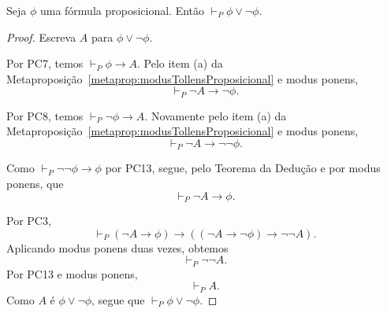 \begin{metalemma}\label{mlem:terceiroExcluidoProposicional}
    Seja $\phi$ uma fórmula proposicional.
    Então $\vdash_P \phi\vee \neg \phi$.
\end{metalemma}
\begin{proof}
    Escreva $A$ para $\phi\vee\neg\phi$.

    Por PC7, temos $\vdash_P \phi\rightarrow A$.
    Pelo item (a) da Metaproposição~\ref{metaprop:modusTollensProposicional} e modus ponens,
    \[
        \vdash_P \neg A\rightarrow \neg\phi.
    \]

    Por PC8, temos $\vdash_P \neg\phi\rightarrow A$.
    Novamente pelo item (a) da Metaproposição~\ref{metaprop:modusTollensProposicional} e modus ponens,
    \[
        \vdash_P \neg A\rightarrow \neg\neg\phi.
    \]

    Como $\vdash_P \neg\neg\phi\rightarrow\phi$ por PC13, segue, pelo Teorema da Dedução e por modus ponens, que
    \[
        \vdash_P \neg A\rightarrow \phi.
    \]

    Por PC3,
    \[
        \vdash_P (\neg A\rightarrow \phi)\rightarrow((\neg A\rightarrow \neg\phi)\rightarrow\neg\neg A).
    \]
    Aplicando modus ponens duas vezes, obtemos
    \[
        \vdash_P \neg\neg A.
    \]
    Por PC13 e modus ponens,
    \[
        \vdash_P A.
    \]
    Como $A$ é $\phi\vee\neg\phi$, segue que $\vdash_P \phi\vee\neg\phi$.
\end{proof}

